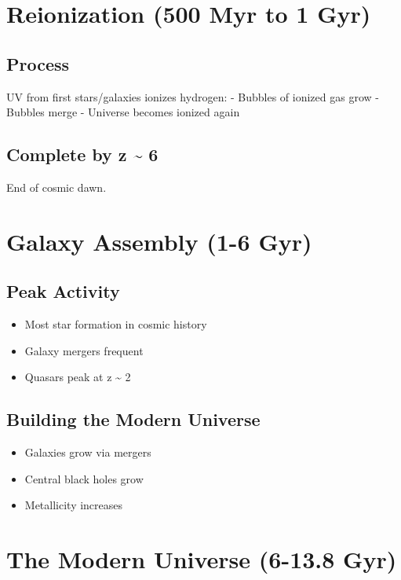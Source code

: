 \documentclass[
  11pt,
  letterpaper,
  twoside,
  openright]{book}
\providecommand{\tightlist}{%
  \setlength{\itemsep}{0pt}\setlength{\parskip}{0pt}}
\begin{document}
\section{Reionization (500 Myr to 1
Gyr)}\label{reionization-500-myr-to-1-gyr}

\subsection{Process}\label{process-1}

UV from first stars/galaxies ionizes hydrogen: - Bubbles of ionized gas
grow - Bubbles merge - Universe becomes ionized again

\subsection{Complete by z \textasciitilde{} 6}\label{complete-by-z-6}

End of cosmic dawn.

\section{Galaxy Assembly (1-6 Gyr)}\label{galaxy-assembly-1-6-gyr}

\subsection{Peak Activity}\label{peak-activity}

\begin{itemize}
\tightlist
\item
  Most star formation in cosmic history
\item
  Galaxy mergers frequent
\item
  Quasars peak at z \textasciitilde{} 2
\end{itemize}

\subsection{Building the Modern
Universe}\label{building-the-modern-universe}

\begin{itemize}
\tightlist
\item
  Galaxies grow via mergers
\item
  Central black holes grow
\item
  Metallicity increases
\end{itemize}

\section{The Modern Universe (6-13.8
Gyr)}\label{the-modern-universe-6-13.8-gyr}
\end{document}
